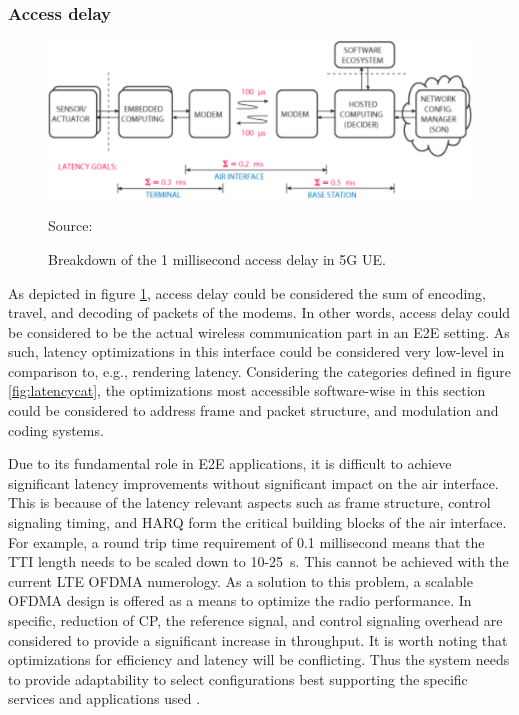 \documentclass[12pt]{article}
\newcommand{\source}[1]{\caption*{Source: {#1}} }
\begin{document}
\subsubsection{Access delay}

\begin{figure}
  \centering
    \includegraphics[width=\textwidth]{./assets/access.png}
  \caption{Breakdown of the 1 millisecond access delay in \gls{5G} \gls{UE}.}
  \source{\cite{fettweis20125g}}
  \label{fig:access}
\end{figure}

As depicted in figure \ref{fig:access}, access delay could be considered the sum of encoding, travel, and decoding of packets of the modems. In other words, access delay could be considered to be the actual wireless communication part in an \gls{E2E} setting. As such, latency optimizations in this interface could be considered very low-level in comparison to, e.g., rendering latency. Considering the categories defined in figure \ref{fig:latencycat}, the optimizations most accessible software-wise in this section could be considered to address frame and packet structure, and modulation and coding systems.

Due to its fundamental role in \gls{E2E} applications, it is difficult to achieve significant latency improvements without significant impact on the air interface. This is because of the latency relevant aspects such as frame structure, control signaling timing, and \gls{HARQ} form the critical building blocks of the air interface. For example, a round trip time requirement of 0.1 millisecond means that the \gls{TTI} length needs to be scaled down to 10-25~{\textmu s}. This cannot be achieved with the current \gls{LTE} \gls{OFDMA} numerology. As a solution to this problem, a scalable \gls{OFDMA} design is offered as a means to optimize the radio performance. In specific, reduction of \gls{CP}, the reference signal, and control signaling overhead are considered to provide a significant increase in throughput. It is worth noting that optimizations for efficiency and latency will be conflicting. Thus the system needs to provide adaptability to select configurations best supporting the specific services and applications used \cite{raaf2011vision}.
\end{document}
